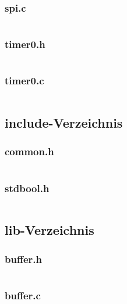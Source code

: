\begin{landscape}
\begin{multicols}{2}
		\subsubsection*{spi.c}
		\inputminted[fontsize=\scriptsize,linenos,tabsize=4]{c}{./code/firmware/driver/spi.c}

		\subsubsection*{timer0.h}
		\inputminted[fontsize=\scriptsize,linenos,tabsize=4]{c}{./code/firmware/driver/timer0.h}

		\subsubsection*{timer0.c}
		\inputminted[fontsize=\scriptsize,linenos,tabsize=4]{c}{./code/firmware/driver/timer0.c}

		\subsection*{include-Verzeichnis}
		\subsubsection*{common.h}
		\inputminted[fontsize=\scriptsize,linenos,tabsize=4]{c}{./code/firmware/include/common.h}

		\subsubsection*{stdbool.h}
		\inputminted[fontsize=\scriptsize,linenos,tabsize=4]{c}{./code/firmware/include/stdbool.h}

		\subsection*{lib-Verzeichnis}
		\subsubsection*{buffer.h}
		\inputminted[fontsize=\scriptsize,linenos,tabsize=4]{c}{./code/firmware/lib/buffer.h}

		\subsubsection*{buffer.c}
		\inputminted[fontsize=\scriptsize,linenos,tabsize=4]{c}{./code/firmware/lib/buffer.c}


\end{multicols}
\end{landscape}
